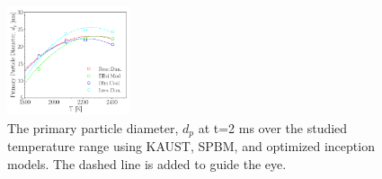 \begin{figure}[H]
	\centering
	\includegraphics[width=0.32\textwidth]{Figures/Results/Shocktube/Stanford/September/10CH4_sootvf_kaust_2ms.pdf}
	\caption{The primary particle diameter, $d_p$ at t=2 ms over the studied temperature range using KAUST, SPBM, and optimized inception models. The dashed line is added to guide the eye.}
	\label{fig:shocktube_10_CH4_dp_incepopt_2ms} 
\end{figure}


